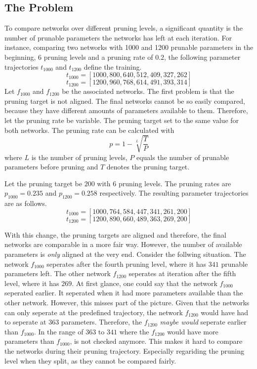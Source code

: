 \subsection{The Problem}
To compare networks over different pruning levels, a significant quantity is the number of prunable parameters the networks has left at each iteration.
For instance, comparing two networks with 1000 and 1200 prunable parameters in the beginning, 6 pruning levels and a pruning rate of $0.2$, the following parameter trajectories $t_{1000}$ and $t_{1200}$ define the training.
\[
t_{1000} = [1000, 800, 640, 512, 409, 327, 262]
\]
\[
t_{1200} = [1200, 960, 768, 614, 491, 393, 314]
\]
Let $f_{1000}$ and $f_{1200}$ be the associated networks.
The first problem is that the pruning target is not aligned.
The final networks cannot be so easily compared, because they have different amounts of parameters available to them.
Therefore, let the pruning rate be variable. The pruning target set to the same value for both networks.
The pruning rate can be calculated with 
\[
p = 1 - \sqrt[L]{\frac{T}{P}}
\]
where $L$ is the number of pruning levels, $P$ equals the number of prunable parameters before pruning and $T$ denotes the pruning target.

Let the pruning target be $200$ with 6 pruning levels.
The pruning rates are $p_{1000} = 0.235$ and $p_{1200} = 0.258$ respectively.
The resulting parameter trajectories are as follows.
\[
t_{1000} = [1000, 764, 584, 447, 341, 261, 200]
\]
\[
t_{1200} = [1200, 890, 660, 489, 363, 269, 200]
\]

With this change, the pruning targets are aligned and therefore, the final networks are comparable in a more fair way.
However, the number of available parameters is \textit{only} aligned at the very end.
Consider the follwing situation.
The network $f_{1000}$ seperates after the fourth pruning level, where it has $341$ prunable parameters left. 
The other network $f_{1200}$ seperates at iteration after the fifth level, where it has $269$.
At first glance, one could say that the network $f_{1000}$ seperated earlier.
It seperated when it had more parameters available than the other network.
However, this misses part of the picture.
Given that the networks can only seperate at the predefined trajectory, the network $f_{1200}$ would have had to seperate at $363$ parameters.
Therefore, the $f_{1200}$ \textit{maybe would} seperate earlier than $f_{1000}$.
In the range of $363$ to $341$ where the $f_{1200}$ would have more parameters than $f_{1000}$, is not checked anymore.
This makes it hard to compare the networks during their pruning trajectory.
Especially regariding the pruning level when they split, as they cannot be compared fairly.

